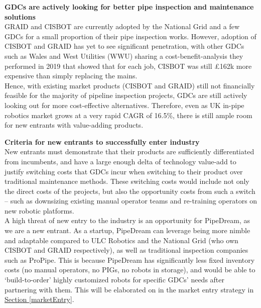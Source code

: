\documentclass[11pt]{article}		%
\newcommand{\sectref}[1]{\hyperref[#1]{Section \ref*{#1}}}     %
\begin{document}
            \textbf{GDCs are actively looking for better pipe inspection and maintenance solutions}
            \\GRAID and CISBOT are currently adopted by the National Grid and a few GDCs for a small proportion of their pipe inspection works. However, adoption of CISBOT and GRAID has yet to see significant penetration, with other GDCs such as Wales and West Utilities (WWU) sharing a cost-benefit-analysis they performed in 2019 that showed that for each job, CISBOT was still £162k more expensive than simply replacing the mains.
             \\\hspace*{3ex}Hence, with existing market products (CISBOT and GRAID) still not financially feasible for the majority of pipeline inspection projects, GDCs are still actively looking out for more cost-effective alternatives. Therefore, even as UK in-pipe robotics market grows at a very rapid CAGR of 16.5\%, there is still ample room for new entrants with value-adding products. 
            
            \textbf{Criteria for new entrants to successfully enter industry}
            \\New entrants must demonstrate that their products are sufficiently differentiated from incumbents, and have a large enough delta of technology value-add to justify switching costs that GDCs incur when switching to their product over traditional maintenance methods. These switching costs would include not only the direct costs of the projects, but also the opportunity costs from such a switch – such as downsizing existing manual operator teams and re-training operators on new robotic platforms. 
            \\\hspace*{3ex}A high threat of new entry to the industry is an opportunity for PipeDream, as we are a new entrant. As a startup, PipeDream can leverage being more nimble and adaptable compared to ULC Robotics and the National Grid (who own CISBOT and GRAID respectively), as well as traditional inspection companies such as ProPipe. This is because PipeDream has significantly less fixed inventory costs (no manual operators, no PIGs, no robots in storage), and would be able to ‘build-to-order’ highly customized robots for specific GDCs’ needs after partnering with them. This will be elaborated on in the market entry strategy in \sectref{marketEntry}. 
            
\end{document}
